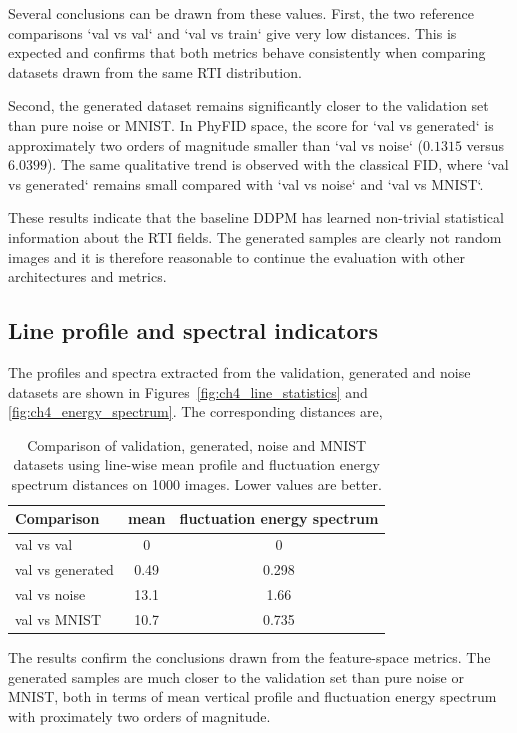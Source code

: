 Several conclusions can be drawn from these values. First, the two reference
comparisons `val vs val` and `val vs train` give very low distances. This is
expected and confirms that both metrics behave consistently when comparing
datasets drawn from the same RTI distribution.

Second, the generated dataset remains significantly closer to the validation
set than pure noise or MNIST. In PhyFID space, the score for `val vs generated`
is approximately two orders of magnitude smaller than `val vs noise`
($0.1315$ versus $6.0399$). The same qualitative trend is observed with the
classical FID, where `val vs generated` remains small compared with
`val vs noise` and `val vs MNIST`.

These results indicate that the baseline DDPM has learned non-trivial
statistical information about the RTI fields. The generated samples are clearly
not random images and it is therefore reasonable to continue the evaluation with 
other architectures and metrics.

\subsection{Line profile and spectral indicators}

The profiles and spectra extracted from the validation, generated and noise datasets are shown in Figures~\ref{fig:ch4_line_statistics} and
\ref{fig:ch4_energy_spectrum}. The corresponding distances are,

\begin{table}[H]
    \centering
    \begin{tabular}{lcc}
        \hline
        Comparison & mean & fluctuation energy spectrum \\
        \hline
        val vs val & 0 & 0 \\
        val vs generated & 0.49 & 0.298 \\
        val vs noise & 13.1 & 1.66 \\
        val vs MNIST & 10.7 & 0.735 \\
        \hline
    \end{tabular}
    \caption{Comparison of validation, generated, noise and MNIST datasets using line-wise mean profile and fluctuation energy spectrum distances on 1000 images. Lower values are better.}
    \label{tab:line_profile_spectrum_baseline}
\end{table}

The results confirm the conclusions drawn from the feature-space metrics. The generated samples are much closer to the validation set than pure noise or MNIST, both in terms of mean vertical profile and fluctuation energy spectrum with proximately two orders of magnitude.

